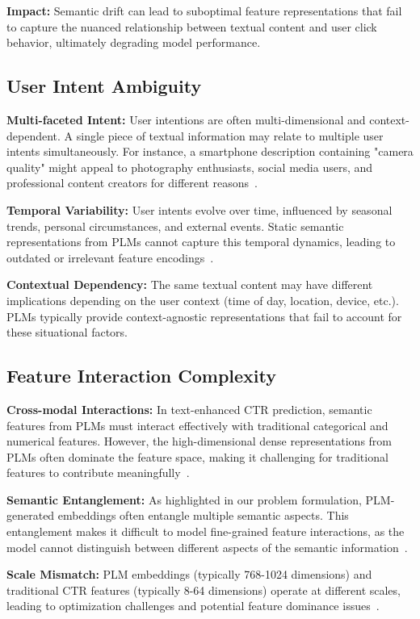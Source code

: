 \textbf{Impact:} Semantic drift can lead to suboptimal feature representations that fail to capture the nuanced relationship between textual content and user click behavior, ultimately degrading model performance.

\subsection{User Intent Ambiguity}

\textbf{Multi-faceted Intent:} User intentions are often multi-dimensional and context-dependent. A single piece of textual information may relate to multiple user intents simultaneously. For instance, a smartphone description containing "camera quality" might appeal to photography enthusiasts, social media users, and professional content creators for different reasons~\cite{ma2019learning}.

\textbf{Temporal Variability:} User intents evolve over time, influenced by seasonal trends, personal circumstances, and external events. Static semantic representations from PLMs cannot capture this temporal dynamics, leading to outdated or irrelevant feature encodings~\cite{zhou2019deep}.

\textbf{Contextual Dependency:} The same textual content may have different implications depending on the user context (time of day, location, device, etc.). PLMs typically provide context-agnostic representations that fail to account for these situational factors.

\subsection{Feature Interaction Complexity}

\textbf{Cross-modal Interactions:} In text-enhanced CTR prediction, semantic features from PLMs must interact effectively with traditional categorical and numerical features. However, the high-dimensional dense representations from PLMs often dominate the feature space, making it challenging for traditional features to contribute meaningfully~\cite{wang2021dcn}.

\textbf{Semantic Entanglement:} As highlighted in our problem formulation, PLM-generated embeddings often entangle multiple semantic aspects. This entanglement makes it difficult to model fine-grained feature interactions, as the model cannot distinguish between different aspects of the semantic information~\cite{wang2024disentangled}.

\textbf{Scale Mismatch:} PLM embeddings (typically 768-1024 dimensions) and traditional CTR features (typically 8-64 dimensions) operate at different scales, leading to optimization challenges and potential feature dominance issues~\cite{guo2024embedding}.

